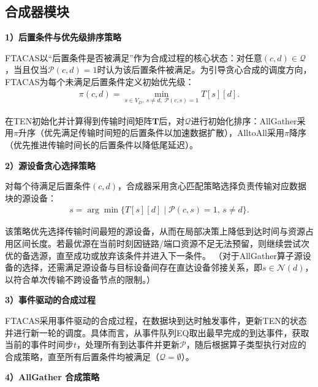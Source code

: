 \subsection{合成器模块}
\label{subsec:ftacas-synth}

\noindent\quad\textbf{1）后置条件与优先级排序策略}

FTACAS以“后置条件是否被满足”作为合成过程的核心状态：对任意$(c,d)\in\mathcal{Q}$，当且仅当$\mathcal{P}(c,d)=1$时认为该后置条件被满足。为引导贪心合成的调度方向，FTACAS为每个未满足后置条件定义初始优先级：
\begin{align}
\pi(c,d)=\min_{s\in V_D,\ s\neq d,\ \mathcal{P}(c,s)=1} T[s][d]. \label{eq:ftacas-priority}
\end{align}

在TEN初始化并计算得到传输时间矩阵$\boldsymbol{T}$后，对$\mathcal{Q}$进行初始化排序：AllGather采用$\pi$升序（优先满足传输时间短的后置条件以加速数据扩散），AlltoAll采用$\pi$降序（优先推进传输时间长的后置条件以降低尾延迟）。

\noindent\quad\textbf{2）源设备贪心选择策略}

对每个待满足后置条件$(c,d)$，合成器采用贪心匹配策略选择负责传输对应数据块的源设备：
\begin{align}
s=\arg\min\{T[s][d]\mid \mathcal{P}(c,s)=1,\,s\neq d\}. \label{eq:ftacas-source-select}
\end{align}

该策略优先选择传输时间最短的源设备，从而在局部决策上降低到达时间与资源占用区间长度。若最优源在当前时刻因链路/端口资源不足无法预留，则继续尝试次优的备选源，直至成功或放弃该条件并进入下一条件。
（对于AllGather算子源设备的选择，还需满足源设备与目标设备间存在直达设备邻接关系，即$s\in\mathcal{N}(d)$，以符合单次传输不跨设备节点的限制。）

\noindent\quad\textbf{3）事件驱动的合成过程}

FTACAS采用事件驱动的合成过程，在数据块到达时触发事件，更新TEN的状态并进行新一轮的调度。具体而言，从事件队列EQ取出最早完成的到达事件，获取当前的事件时间步$t$，处理所有到达事件并更新$\mathcal{P}$，随后根据算子类型执行对应的合成策略，直至所有后置条件均被满足（$\mathcal{Q}=\emptyset$）。



\noindent\quad\textbf{4）AllGather 合成策略}

